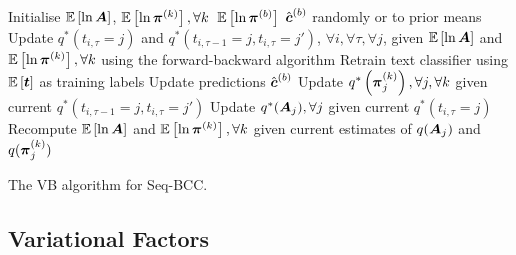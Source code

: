 %
\begin{algorithm}
 Initialise $\mathbb{E}\left[\ln \boldsymbol A \right]$,
 $\mathbb{E}\left[\ln\boldsymbol\pi^{(k)} \right], \forall k$\,
 $\mathbb{E}\left[\ln\boldsymbol\pi^{(b)} \right]$ 
 $\hat{\boldsymbol c}^{(b)}$ randomly or to prior means\;
 {
 Update $q^*(t_{i,\tau}=j)$ and $q^*(t_{i,\tau-1}=j, t_{i,\tau}=j')$, $\forall i,\forall \tau,\forall j$,
 given $\mathbb{E}\left[\ln \boldsymbol A \right]$ and 
 $\mathbb{E}\left[\ln\boldsymbol\pi^{(k)} \right], \forall k$
 using the forward-backward algorithm\;
 Retrain text classifier using $\mathbb{E}\left[\boldsymbol t\right]$ as training labels\;
 Update predictions $\hat{\boldsymbol c}^{(b)}$\;
 Update $q^*\left(\boldsymbol\pi_j^{(k)}\right), \forall j, \forall k$ given current $q^*(t_{i,\tau-1}=j, t_{i,\tau}=j')$\;
 Update $q^*(\boldsymbol A_j), \forall j$ given current $q^*(t_{i,\tau}=j)$\; 
 Recompute $\mathbb{E}\left[\ln \boldsymbol A \right]$ 
 and $\mathbb{E}\left[\ln\boldsymbol\pi^{(k)} \right], \forall k$ given current estimates of
 $q(\boldsymbol A_j)$ and $q(\boldsymbol\pi_j^{(k)})$\; 
 }
\caption{The VB algorithm for Seq-BCC.}
\label{al:vb_bac}
\end{algorithm}

\subsection{Variational Factors}

